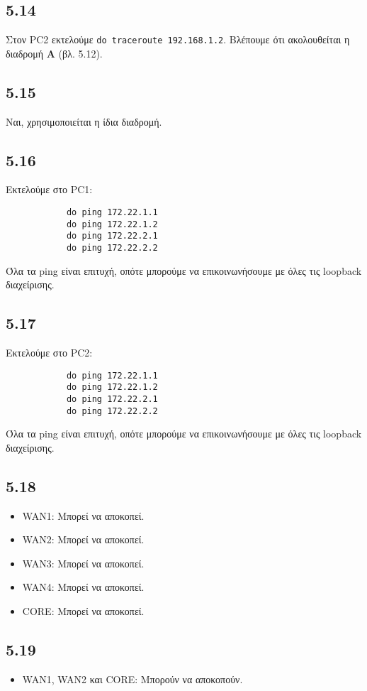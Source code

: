 \documentclass[a4paper, 12pt]{article}
\begin{document}
	\subsection*{5.14}
		Στον PC2 εκτελούμε \verb|do traceroute 192.168.1.2|. Βλέπουμε ότι ακολουθείται η διαδρομή \textbf{Α} (βλ. 5.12).

	\subsection*{5.15}
		Ναι, χρησιμοποιείται η ίδια διαδρομή.

	\subsection*{5.16}
		Εκτελούμε στο PC1:
		
		\begin{verbatim}
			do ping 172.22.1.1
			do ping 172.22.1.2
			do ping 172.22.2.1
			do ping 172.22.2.2
		\end{verbatim}
		
		Όλα τα ping είναι επιτυχή, οπότε μπορούμε να επικοινωνήσουμε με όλες τις loopback διαχείρισης.

	\subsection*{5.17}
		Εκτελούμε στο PC2:
		
		\begin{verbatim}
			do ping 172.22.1.1
			do ping 172.22.1.2
			do ping 172.22.2.1
			do ping 172.22.2.2
		\end{verbatim}
		
		Όλα τα ping είναι επιτυχή, οπότε μπορούμε να επικοινωνήσουμε με όλες τις loopback διαχείρισης.

	\subsection*{5.18}
		\begin{itemize}
			\item WAN1: Μπορεί να αποκοπεί.
			\item WAN2: Μπορεί να αποκοπεί.
			\item WAN3: Μπορεί να αποκοπεί.
			\item WAN4: Μπορεί να αποκοπεί.
			\item CORE: Μπορεί να αποκοπεί.
		\end{itemize}

	\subsection*{5.19}
		\begin{itemize}
			\item WAN1, WAN2 και CORE: Μπορούν να αποκοπούν.
		\end{itemize}
\end{document}

